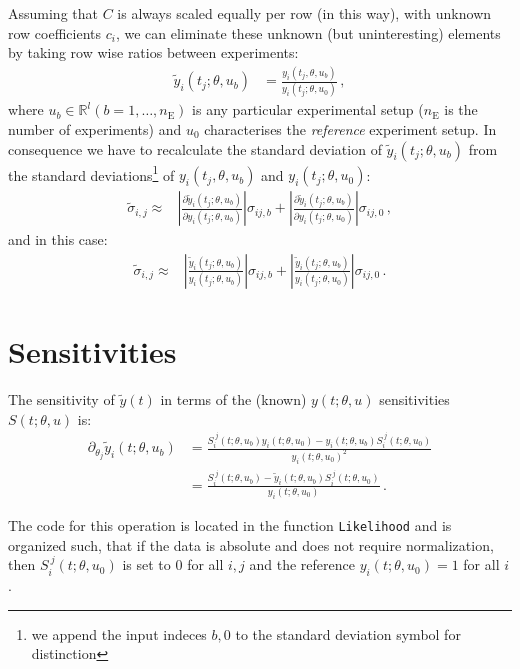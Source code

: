 \documentclass[utf8,english]{scrartcl}
\begin{document}
Assuming that $C$ is always scaled equally per row (in this way),
 with unknown row coefficients $c_i$, we can eliminate these unknown
(but uninteresting) elements by taking row wise ratios between experiments:
\begin{align}
  \tilde y_i(t_j;\theta,u_b) &=
  \frac{y_i(t_j,\theta,u_b)}{y_i(t_j;\theta,u_0)}\,,
\end{align}
where $u_b\in\mathbb{R}^l (b=1,\dots,n_{\text{E}})$ is any particular
experimental setup ($n_{\text{E}}$ is the number of experiments) and
$u_0$ characterises the \emph{reference} experiment setup.  In
consequence we have to recalculate the standard deviation of $\tilde
y_i(t_j;\theta,u_b)$ from the standard deviations\footnote{we append
  the input indeces $b,0$ to the standard deviation symbol for
  distinction} of ${y_i(t_j,\theta,u_b)}$ and ${y_i(t_j;\theta,u_0)}$:
\begin{align}
  \label{eq:std_y}
  \tilde\sigma_{i,j}\approx&\left|\frac{\partial\tilde
      y_i(t_j;\theta,u_b)}{\partial
      y_i(t_j;\theta,u_b)}\right|\sigma_{ij,b} +
  \left|\frac{\partial\tilde y_i(t_j;\theta,u_b)}{\partial
      y_i(t_j;\theta,u_0)}\right|\sigma_{ij,0}\,,
\end{align}
and in this case:
\begin{align}
  \label{eq:std_yy}
  \tilde\sigma_{i,j}\approx&\left|\frac{\tilde
      y_i(t_j;\theta,u_b)}{y_i(t_j;\theta,u_b)}\right|\sigma_{ij,b} +
  \left|\frac{\tilde
      y_i(t_j;\theta,u_b)}{y_i(t_j;\theta,u_0)}\right|\sigma_{ij,0}\,.
\end{align}


\section{Sensitivities}
\label{sec:sens}

The sensitivity of $\tilde y(t)$ in terms of the (known) $y(t;\theta,u)$ sensitivities $S(t;\theta,u)$ is:
\begin{align}
  \partial_{\theta_j} \tilde y_i(t;\theta,u_b) 
  &= \frac{S_i^{~j}(t;\theta,u_b)y_i(t;\theta,u_0)
    -y_i(t;\theta,u_b)S_i^{~j}(t;\theta,u_0)}{y_i(t;\theta,u_0)^2}\nonumber\\
  &= \frac{S_i^{~j}(t;\theta,u_b) 
    - \tilde y_i(t;\theta,u_b)S_i^{~j}(t;\theta,u_0)}{y_i(t;\theta,u_0)}\,.  \label{eq:fyS}
\end{align}

The code for this operation is located in the function
\texttt{Likelihood} and is organized such, that if the data is
absolute and does not require normalization, then
$S_i^{~j}(t;\theta,u_0)$ is set to $0$ for all $i,j$ and the reference
$y_i(t;\theta,u_0)=1$ for all $i$.
\end{document}

